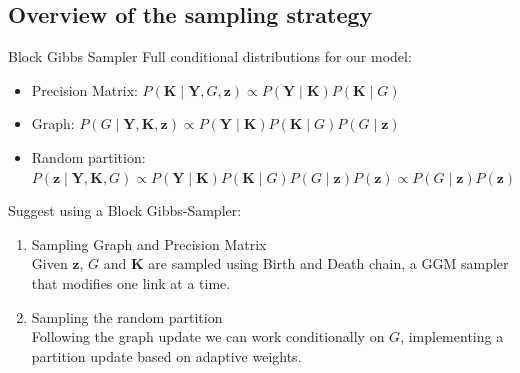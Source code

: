 \subsection{Overview of the sampling strategy}
\begin{frame}{Block Gibbs Sampler}
    Full conditional distributions for our model:
    \begin{itemize}
        \item Precision Matrix: $P(\bm{K} \mid \bm{Y},G,\bm{z}) \propto P(\bm{Y} \mid \bm{K})P(\bm{K} \mid {G})$ 

        \item Graph: $P(G \mid \bm{Y},\bm{K},\bm{z}) \propto P(\bm{Y} \mid \bm{K})P(\bm{K} \mid {G})P(G \mid \bm{z})$ 

        \item Random partition: $P(\bm{z} \mid \bm{Y},\bm{K},G) \propto P(\bm{Y} \mid \bm{K})P(\bm{K} \mid {G})P(G \mid \bm{z})P(\bm{z}) \propto P(G \mid \bm{z})P(\bm{z}) $
    \end{itemize}

    Suggest using a Block Gibbs-Sampler:
    \begin{enumerate}
        \item \alert{Sampling Graph and Precision Matrix}\\
        Given $\bm{z}$, $G$ and $\bm{K}$ are sampled using Birth and Death chain, a GGM sampler that modifies one link at a time.
        \item \alert{Sampling the random partition}\\
        Following the graph update we can work conditionally on $G$, implementing a partition update based on adaptive weights.
    \end{enumerate}
\end{frame}




